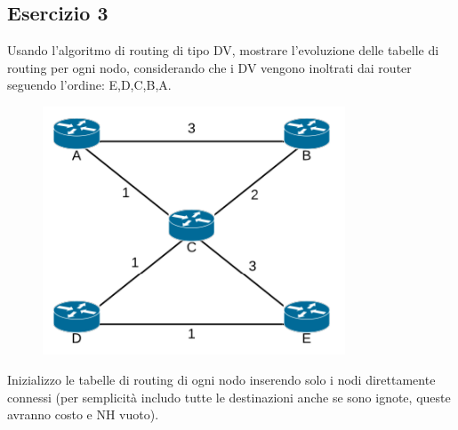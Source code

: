 \documentclass[10pt]{article}
\begin{document}
		\subsection{Esercizio 3}
			Usando l'algoritmo di routing di tipo DV, mostrare l'evoluzione delle tabelle di routing per ogni nodo, considerando che i DV vengono inoltrati dai router seguendo l'ordine: E,D,C,B,A.
			\begin{figure}[h!]
				\centering
				\includegraphics[width=9cm]{esercizio3}
			\end{figure}
			\newline
			Inizializzo le tabelle di routing di ogni nodo inserendo solo i nodi direttamente connessi (per semplicità includo tutte le destinazioni anche se sono ignote, queste avranno costo e NH vuoto).
\end{document}
